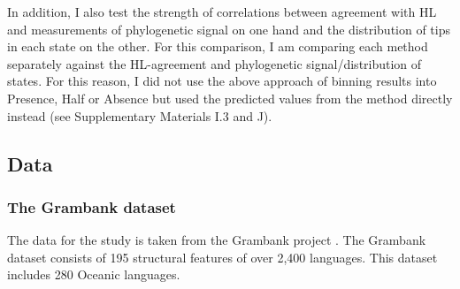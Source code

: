\documentclass[12pt,letterpaper]{article}
\begin{document}
 
In addition, I also test the strength of correlations between agreement with HL and measurements of phylogenetic signal on one hand and the distribution of tips in each state on the other. For this comparison, I am comparing each method separately against the HL-agreement and phylogenetic signal/distribution of states. For this reason, I did not use the above approach of binning results into Presence, Half or Absence but used the predicted values from the method directly instead (see Supplementary Materials I.3 and J).

\FloatBarrier
\subsection{Data}

\subsubsection{The Grambank dataset}
\label{asr:sec:GBcoverage}

The data for the study is taken from the Grambank project \citep{grambank_release}. The Grambank dataset consists of 195 structural features of over 2,400 languages. This dataset includes 280 Oceanic languages. 


 
\end{document}

